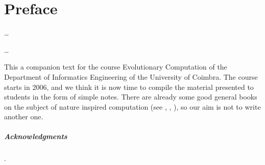 \chapter*{Preface}\label{cap:preface}


\epigraph{\ldots}{\ldots}


This a companion text for the course Evolutionary Computation of the Department of Informatics Engineering of the University of Coimbra. The course starts in 2006,  and we think it  is now time to compile the material presented to students in the form of simple notes. There are already some good general books on the subject of nature inspired computation (see \cite{Castro2006}, \cite{Floreano2008}, \cite{Brabazon2015}), so our aim is not to write another one. \\


\paragraph{Acknowledgments}.\\